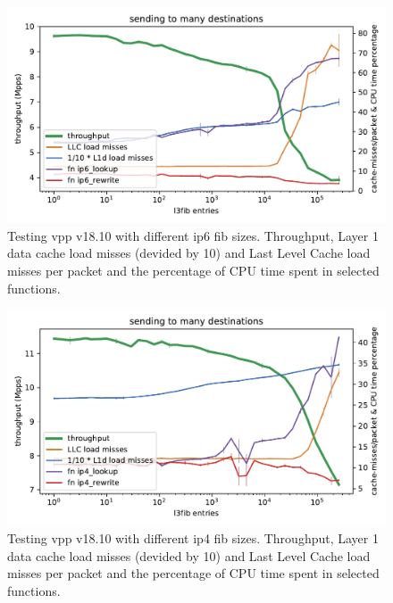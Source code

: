 \begin{figure}[!ht]
\noindent\hspace{0.5mm}\includegraphics[width=\linewidth]{pics/throughput_l3v6_routes_klaipeda32ghz_v2.pdf}
\caption{Testing \Ac{vpp} v18.10 with different \Ac{ip6} \Ac{fib} sizes. Throughput, Layer 1 data cache load misses (devided by 10) and Last Level Cache load misses per packet and the percentage of CPU time spent in selected functions. }
\label{graph:ip6fib}
\end{figure}

\begin{figure}[!ht]
\noindent\hspace{0.5mm}\includegraphics[width=\linewidth]{pics/throughput_l3_routes_klaipeda32ghz_v2.pdf}
\caption{Testing \Ac{vpp} v18.10 with different \Ac{ip4} \Ac{fib} sizes. Throughput, Layer 1 data cache load misses (devided by 10) and Last Level Cache load misses per packet and the percentage of CPU time spent in selected functions.}
\label{graph:ip4fib}
\end{figure}


